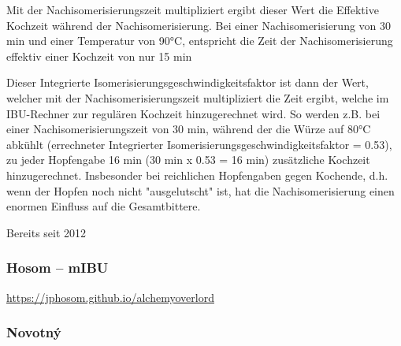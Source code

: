\documentclass[a4paper,parskip=half]{scrartcl}
\begin{document}

Mit der Nachisomerisierungszeit multipliziert ergibt dieser Wert die Effektive Kochzeit während der Nachisomerisierung. Bei einer Nachisomerisierung von 30 min und einer Temperatur von 90°C, entspricht die Zeit der Nachisomerisierung effektiv einer Kochzeit von nur 15 min %


Dieser Integrierte Isomerisierungsgeschwindigkeitsfaktor ist dann der Wert, welcher mit der Nachisomerisierungszeit multipliziert die Zeit ergibt, welche im IBU-Rechner zur regulären Kochzeit hinzugerechnet wird. So werden z.B. bei einer Nachisomerisierungszeit von 30 min, während der die Würze auf 80°C abkühlt (errechneter Integrierter Isomerisierungsgeschwindigkeitsfaktor = 0.53), zu jeder Hopfengabe 16 min (30 min x 0.53 = 16 min) zusätzliche Kochzeit hinzugerechnet. Insbesonder bei reichlichen Hopfengaben gegen Kochende, d.h. wenn der Hopfen noch nicht "ausgelutscht" ist, hat die Nachisomerisierung einen enormen Einfluss auf die Gesamtbittere. 

Bereits seit 2012

\parencite{Wolf2022}

\subsubsection*{Hosom – mIBU}

\url{https://jphosom.github.io/alchemyoverlord}

\parencite{Hosom2015}

\subsubsection*{Novotný}
\end{document}
